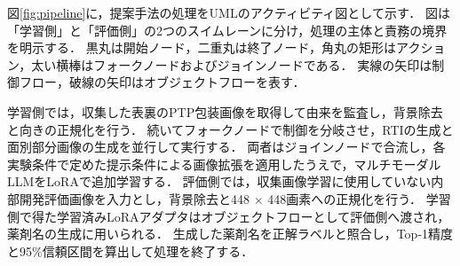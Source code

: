 \documentclass[uplatex,dvipdfmx]{jsarticle}
\begin{document}
図\ref{fig:pipeline}に，提案手法の処理をUMLのアクティビティ図として示す．
図は「学習側」と「評価側」の2つのスイムレーンに分け，処理の主体と責務の境界を明示する．
黒丸は開始ノード，二重丸は終了ノード，角丸の矩形はアクション，太い横棒はフォークノードおよびジョインノードである．
実線の矢印は制御フロー，破線の矢印はオブジェクトフローを表す．

学習側では，収集した表裏のPTP包装画像を取得して由来を監査し，背景除去と向きの正規化を行う．
続いてフォークノードで制御を分岐させ，RTIの生成と面別部分画像の生成を並行して実行する．
両者はジョインノードで合流し，各実験条件で定めた提示条件による画像拡張を適用したうえで，マルチモーダルLLMをLoRAで追加学習する．
評価側では，収集画像学習に使用していない内部開発評価画像を入力とし，背景除去と448 $\times$ 448画素への正規化を行う．
学習側で得た学習済みLoRAアダプタはオブジェクトフローとして評価側へ渡され，薬剤名の生成に用いられる．
生成した薬剤名を正解ラベルと照合し，Top-1精度と95\%信頼区間を算出して処理を終了する．
\end{document}
